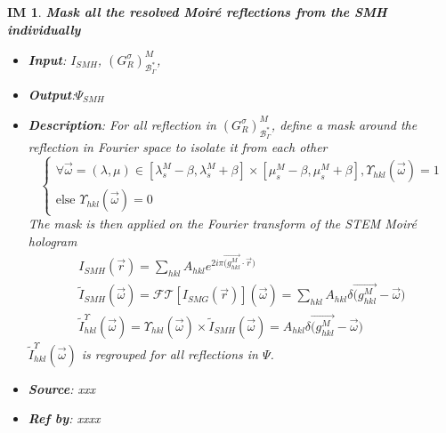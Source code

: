 \documentclass[12pt]{article}
\newtheorem{IM}{IM}
\begin{document}
\begin{IM}
\label{IM_4}
\noindent\colorbox{shadecolorIM}{\normalfont \textbf{Mask all the resolved Moir{\'e} reflections from the SMH individually}}
\normalfont
\begin{itemize}
\item \textbf{Input}: $I_{SMH}$, $(G^{\sigma}_{R})^{M}_{\mathcal{B}_{\Gamma}^{*}}$,
\item \textbf{Output}:$\Psi_{SMH}$
\item \textbf{Description}: For all reflection in $(G^{\sigma}_{R})^{M}_{\mathcal{B}_{\Gamma}^{*}}$, define a mask around the reflection in Fourier space to isolate it from each other
\begin{equation*}
\begin{cases}
\forall \vec{\omega} = (\lambda, \mu) \in [\lambda_{s}^{M}-\beta, \lambda_{s}^{M}+\beta]\times [\mu_{s}^{M}-\beta, \mu_{s}^{M}+\beta], \Upsilon_{hkl}(\vec{\omega}) = 1   \\
\text{else } \Upsilon_{hkl}(\vec{\omega}) = 0
\end{cases}
\end{equation*}
The mask is then applied on the Fourier transform of the  STEM Moir{\'e} hologram
\begin{equation*}
\begin{gathered}
I_{SMH}(\vec{r})= \sum_{hkl}A_{hkl}e^{2i\pi \overrightarrow{(g_{hkl}^{M}} \cdot \overrightarrow{r})} \\
\tilde{I}_{SMH}(\vec{\omega}) = \mathcal{FT}[I_{SMG}(\vec{r})](\vec{\omega})  = \sum_{hkl}A_{hkl}\delta{\overrightarrow{(g_{hkl}^{M}}} -\overrightarrow{\omega}) \\
\tilde{I}_{hkl}^{\Upsilon}(\vec{\omega})=\Upsilon_{hkl}(\vec{\omega}) \times  \tilde{I}_{SMH}(\vec{\omega})= A_{hkl}\delta{\overrightarrow{(g_{hkl}^{M}}} -\overrightarrow{\omega})
\end{gathered}
\end{equation*}
$\tilde{I}_{hkl}^{\Upsilon}(\vec{\omega})$ is regrouped for all reflections in $\Psi$.
\item \textbf{Source}: xxx
\item \textbf{Ref by}: xxxx
\end{itemize}
\end{IM}
\end{document}
